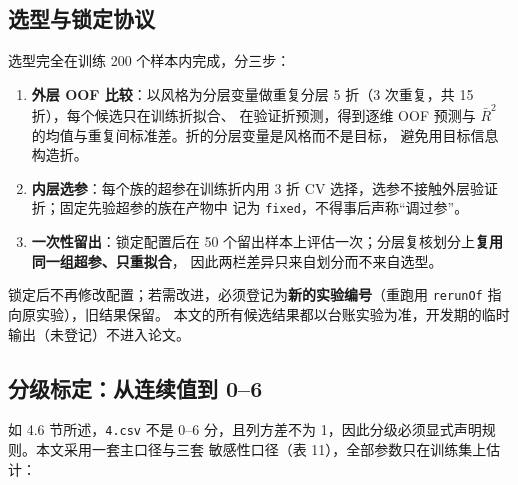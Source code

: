\documentclass[
  a4paper,12pt]{article}
\providecommand{\tightlist}{%
  \setlength{\itemsep}{0pt}\setlength{\parskip}{0pt}}
\begin{document}
\subsection{选型与锁定协议}\label{ux9009ux578bux4e0eux9501ux5b9aux534fux8bae}

选型完全在训练 200 个样本内完成，分三步：

\begin{enumerate}
\def\labelenumi{\arabic{enumi}.}
\tightlist
\item
  \textbf{外层 OOF 比较}：以风格为分层变量做重复分层 5 折（3 次重复，共
  15 折），每个候选只在训练折拟合、 在验证折预测，得到逐维 OOF 预测与
  \(\bar R^2\) 的均值与重复间标准差。折的分层变量是风格而不是目标，
  避免用目标信息构造折。
\item
  \textbf{内层选参}：每个族的超参在训练折内用 3 折 CV
  选择，选参不接触外层验证折；固定先验超参的族在产物中 记为
  \texttt{fixed}，不得事后声称``调过参''。
\item
  \textbf{一次性留出}：锁定配置后在 50
  个留出样本上评估一次；分层复核划分上\textbf{复用同一组超参、只重拟合}，
  因此两栏差异只来自划分而不来自选型。
\end{enumerate}

锁定后不再修改配置；若需改进，必须登记为\textbf{新的实验编号}（重跑用
\texttt{rerunOf} 指向原实验），旧结果保留。
本文的所有候选结果都以台账实验为准，开发期的临时输出（未登记）不进入论文。

\subsection{分级标定：从连续值到
0--6}\label{ux5206ux7ea7ux6807ux5b9aux4eceux8fdeux7eedux503cux5230-06}

如 4.6 节所述，\texttt{4.csv} 不是 0--6 分，且列方差不为
1，因此分级必须显式声明规则。本文采用一套主口径与三套 敏感性口径（表
11），全部参数只在训练集上估计：
\end{document}
